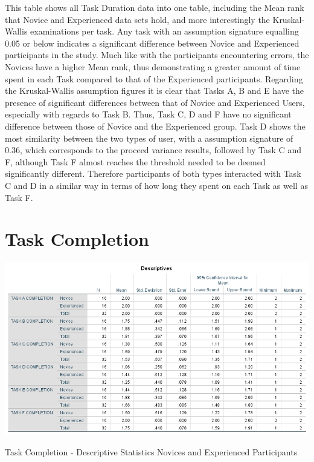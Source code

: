 This table shows all Task Duration data into one table, including the Mean rank that Novice and Experienced data sets hold, and more interestingly the Kruskal-Wallis examinations per task. Any task with an assumption signature equalling 0.05 or below indicates a significant difference between Novice and Experienced participants in the study. Much like with the participants encountering errors, the Novices have a higher Mean rank, thus demonstrating a greater amount of time spent in each Task compared to that of the Experienced participants. Regarding the Kruskal-Wallis assumption figures it is clear that Tasks A, B and E have the presence of significant differences between that of Novice and Experienced Users, especially with regards to Task B. Thus, Task C, D and F have no significant difference between those of Novice and the Experienced group. Task D shows the most similarity between the two types of user, with a assumption signature of 0.36, which corresponds to the proceed variance results, followed by Task C and F, although Task F almost reaches the threshold needed to be deemed significantly different. Therefore participants of both types interacted with Task C and D in a similar way in terms of how long they spent on each Task as well as Task F.


\section{Task Completion}
\begin{table}[H]
\includegraphics[width=\linewidth]{Screenshots/UXResearchDataFiles/UXTaskCompletionData/anovaDescriptivesTaskCompletion.png}
\label{DescriptiveTaskCompletionTotalPopulation}
\caption{Task Completion - Descriptive Statistics Novices and Experienced Participants}
\end{table}

